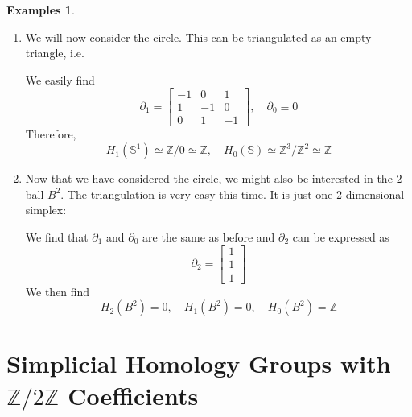 \documentclass[draft,toc=bib]{scrartcl}
\theoremstyle{plain}
\theoremstyle{definition}
\newtheorem{examples}[theorem]{Examples}
\theoremstyle{remark}
\newcommand{\SH}{Simplicial Homology}
\newcommand{\Z}{\mathbb{Z}}
\newcommand{\Sp}{\mathbb{S}}
\begin{document}
\begin{examples}
\begin{enumerate}
\item We will now consider the circle. This can be triangulated as an empty triangle, i.e.
\begin{center}
	
\end{center}

We easily find 
\[
\partial_1=\begin{bmatrix}
-1&0&1\\1&-1&0\\0&1&-1
\end{bmatrix},\quad \partial_0\equiv 0
\]
Therefore,
\[H_1(\Sp^1)\simeq\Z/0\simeq\Z,\quad H_0(\Sp)\simeq\Z^3/\Z^2\simeq\Z
\]
\item 
Now that we have considered the circle, we might also be interested in the $2$-ball $B^2$. The triangulation is very easy this time. It is just one 2-dimensional simplex:
\begin{center}

We find that $\partial_1$ and $\partial_0$ are the same as before and $\partial_2$ can be expressed as
\[
\partial_2=\begin{bmatrix}
1\\1\\1
\end{bmatrix}
\]
We then find
\[
H_2(B^2)=0,\quad H_1(B^2)=0,\quad H_0(B^2)=\Z
\]

\end{center}
	\end{enumerate}
%

\end{examples}


\section{\SH{} Groups with $\mathbb{Z}/2\mathbb{Z}$ Coefficients}
\end{document}
